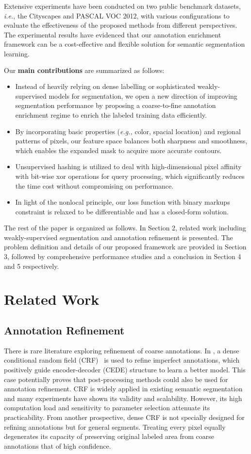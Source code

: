 \documentclass[sigconf]{acmart}
\begin{document}
Extensive experiments have been conducted on two public benchmark datasets, \textit{i.e.}, the Cityscapes and PASCAL VOC 2012, with various configurations to evaluate the effectiveness of the proposed methods from different perspectives. The experimental results have evidenced that our annotation enrichment framework can be a cost-effective and flexible solution for semantic segmentation learning.

Our \textbf{main contributions} are summarized as follows:
\begin{itemize}
	\item Instead of heavily relying on dense labelling or sophisticated weakly-supervised models for segmentation, we open a new direction of improving segmentation performance by proposing a coarse-to-fine annotation enrichment regime to enrich the labeled training data efficiently.
	\item By incorporating basic properties (\textit{e.g.,} color, spacial location) and regional patterns of pixels, our feature space balances both sharpness and smoothness, which enables the expanded mask to acquire more accurate contours.
	\item Unsupervised hashing is utilized to deal with high-dimensional pixel affinity with bit-wise xor operations for query processing, which significantly reduces the time cost without compromising on performance.
	\item In light of the nonlocal principle, our loss function with binary markups constraint is relaxed to be differentiable and has a closed-form solution.
\end{itemize}
The rest of the paper is organized as follows. In Section 2, related work including weakly-supervised segmentation and annotation refinement is presented. The problem definition and details of our proposed framework are provided in Section 3, followed by comprehensive performance studies and a conclusion in Section 4 and 5 respectively.

\section{Related Work}
\subsection{Annotation Refinement}
There is rare literature exploring refinement of coarse annotations. In \cite{objectcontour}, a dense conditional random field (CRF)~\cite{densecrf} is used to refine imperfect annotations, which positively guide encoder-decoder (CEDE) structure to learn a better model. This case potentially proves that post-processing methods could also be used for annotation refinement. CRF is widely applied in existing semantic segmentation~\cite{deeplab,crfasrnn,DBLP:conf/cvpr/ShenGYZ17,DBLP:conf/eccv/ChandraK16,DBLP:journals/tip/ZandDHM16} and many experiments have shown its validity and scalability. However, its high computation load and sensitivity to parameter selection attenuate its practicability. From another prospective, dense CRF is not specially designed for refining annotations but for general segments. Treating every pixel equally degenerates its capacity of preserving original labeled area from coarse annotations that of high confidence.
\end{document}
